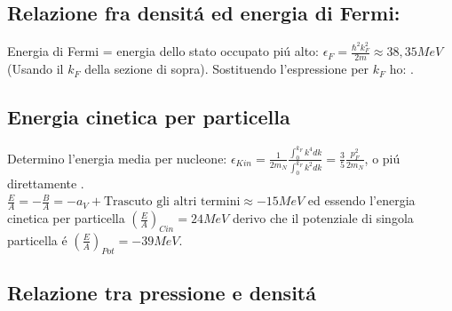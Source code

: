 \subsection{Relazione fra densit\'a ed energia di Fermi:}
Energia di Fermi = energia dello stato occupato pi\'u alto: $\epsilon_F=\frac{\hbar^2k_F^2}{2m}\approx 38,35 MeV$ (Usando il $k_F$ della sezione di sopra).
Sostituendo l'espressione per $k_F$ ho: . 

\subsection{Energia cinetica per particella}
Determino l'energia media per nucleone:
$\epsilon_{Kin}=\frac{1}{2m_N}\frac{\int_0^{k_F}k^4dk}{\int_0^{k_F}k^2dk}=\frac{3}{5}\frac{p_F^2}{2m_N}$, o pi\'u direttamente .\\
$\frac{E}{A}=- \frac{B}{A}=-a_V+\text{Trascuto gli altri termini}\approx-15 MeV$ ed essendo l'energia cinetica per particella $(\frac{E}{A})_{Cin}=24 MeV$ derivo che il potenziale di singola particella \'e $(\frac{E}{A})_{Pot}=-39MeV$.

\subsection{Relazione tra pressione e densit\'a}


